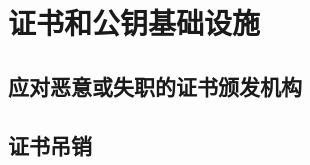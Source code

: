 \section{证书和公钥基础设施}\label{sec:13-8}

\subsection{应对恶意或失职的证书颁发机构}\label{subsec:13-8-1}

\subsection{证书吊销}\label{subsec:13-8-2}